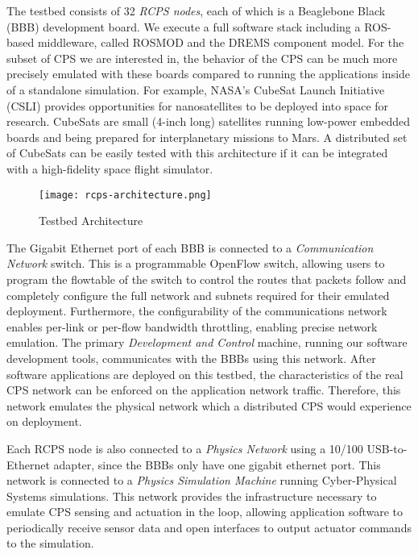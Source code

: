 The testbed consists of 32 \emph{RCPS nodes}, each of which is a Beaglebone Black (BBB) \cite{BBB} development board. We execute a full software stack including a ROS-based middleware, called ROSMOD \cite{kumarROSMOD} and the DREMS component model. For the subset of CPS we are interested in, the behavior of the CPS can be much more precisely emulated with these boards compared to running the applications inside of a standalone simulation. For example, NASA's CubeSat Launch Initiative (CSLI) \cite{CubeSat} provides opportunities for nanosatellites to be deployed into space for research. CubeSats are small (4-inch long) satellites running low-power embedded boards and being prepared for interplanetary missions \cite{CubeSat_Mars} to Mars. A distributed set of CubeSats can be easily tested with this architecture if it can be integrated with a high-fidelity space flight simulator.  

\begin{figure}[h]
    \centering
    \texttt{[image: rcps-architecture.png]}
    \caption{Testbed Architecture}
    \label{fig:architecture}
\end{figure}

The Gigabit Ethernet port of each BBB is connected to a \emph{Communication Network} switch. This is a programmable OpenFlow \cite{openflow} switch, allowing users to program the flowtable of the switch to control the routes that packets follow and completely configure the full network and subnets required for their emulated deployment.  Furthermore, the configurability of the communications network enables per-link or per-flow bandwidth throttling, enabling precise network emulation.  The primary \emph{Development and Control} machine, running our software development tools, communicates with the BBBs using this network. After software applications are deployed on this testbed, the characteristics of the real CPS network can be enforced on the application network traffic. Therefore, this network emulates the physical network which a distributed CPS would experience on deployment.

Each RCPS node is also connected to a \emph{Physics Network} using a 10/100 USB-to-Ethernet adapter, since the BBBs only have one gigabit ethernet port. This network is connected to a \emph{Physics Simulation Machine} running Cyber-Physical Systems simulations. This network provides the infrastructure necessary to emulate CPS sensing and actuation in the loop, allowing application software to periodically receive sensor data and open interfaces to output actuator commands to the simulation.

